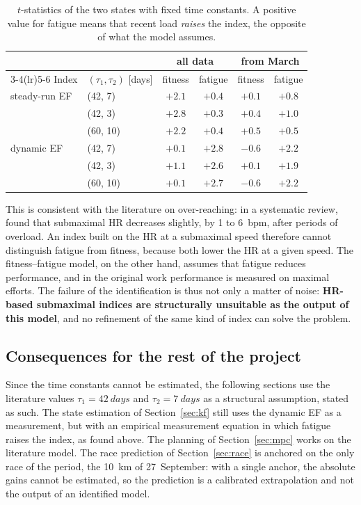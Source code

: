 \documentclass[11pt,a4paper]{article}
\begin{document}
\begin{table}[ht]
\centering
\caption{$t$-statistics of the two states with fixed time constants.
A positive value for fatigue means that recent load \emph{raises} the index,
the opposite of what the model assumes.}
\label{tab:tstat}
\small
\begin{tabular}{@{}llcccc@{}}
\toprule
 & & \multicolumn{2}{c}{all data} & \multicolumn{2}{c}{from March} \\
\cmidrule(lr){3-4}\cmidrule(lr){5-6}
Index & $(\tau_1,\tau_2)$ [days] & fitness & fatigue & fitness & fatigue \\
\midrule
steady-run EF & (42, 7)  & $+2.1$ & $+0.4$ & $+0.1$ & $+0.8$ \\
              & (42, 3)  & $+2.8$ & $+0.3$ & $+0.4$ & $+1.0$ \\
              & (60, 10) & $+2.2$ & $+0.4$ & $+0.5$ & $+0.5$ \\
dynamic EF    & (42, 7)  & $+0.1$ & $\mathbf{+2.8}$ & $-0.6$ & $\mathbf{+2.2}$ \\
              & (42, 3)  & $+1.1$ & $\mathbf{+2.6}$ & $+0.1$ & $+1.9$ \\
              & (60, 10) & $+0.1$ & $\mathbf{+2.7}$ & $-0.6$ & $\mathbf{+2.2}$ \\
\bottomrule
\end{tabular}
\end{table}

This is consistent with the literature on over-reaching: in a systematic review,
\citet{bosquet2008} found that submaximal HR decreases slightly, by 1 to
\SI{6}{bpm}, after periods of overload. An index built on the HR at a
submaximal speed therefore cannot distinguish fatigue from fitness, because both
lower the HR at a given speed. The fitness--fatigue model, on the other hand,
assumes that fatigue reduces performance, and in the original work performance
is measured on maximal efforts. The failure of the identification is thus not
only a matter of noise: \textbf{HR-based submaximal indices are structurally
unsuitable as the output of this model}, and no refinement of the same kind of
index can solve the problem.

\subsection{Consequences for the rest of the project}
Since the time constants cannot be estimated, the following sections use the
literature values $\tau_1 = \SI{42}{days}$ and $\tau_2 = \SI{7}{days}$ as a
structural assumption, stated as such. The state estimation of
Section~\ref{sec:kf} still uses the dynamic EF as a measurement, but with an
empirical measurement equation in which fatigue raises the index, as found
above. The planning of Section~\ref{sec:mpc} works on the literature model. The
race prediction of Section~\ref{sec:race} is anchored on the only race of the
period, the \SI{10}{km} of 27~September: with a single anchor, the absolute
gains cannot be estimated, so the prediction is a calibrated extrapolation and
not the output of an identified model.
\end{document}
